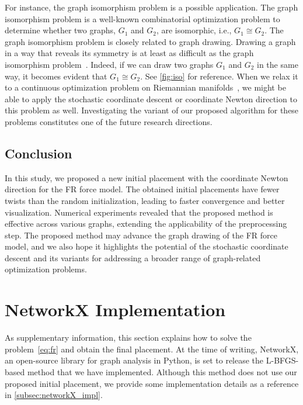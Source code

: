 \documentclass[11pt]{article}
\begin{document}
For instance, the graph isomorphism problem is a possible application. The
graph isomorphism problem is a well-known combinatorial optimization problem
to determine whether two graphs, $G_{1}$ and $G_{2}$, are isomorphic, i.e., $G_{1}
  \cong G_{2}$. The graph isomorphism problem is closely related to graph drawing. Drawing a graph in a way that reveals its symmetry is at least as difficult as the graph isomorphism problem~\citep{eades1984heuristic}. Indeed, if we can
draw two graphs $G_{1}$ and $G_{2}$ in the same way, it becomes evident that $G
    _{1}\cong G_{2}$. See \cref{fig:iso} for reference. When we relax it to a continuous
optimization problem on Riemannian manifolds~\citep{klusContinuousOptimizationMethods2023},
we might be able to apply the stochastic coordinate descent or coordinate Newton
direction to this problem as well. Investigating the variant of our proposed
algorithm for these problems constitutes one of the future research directions.

\subsection{Conclusion}
\label{sec:conclusion}

In this study, we proposed a new initial placement with the coordinate Newton
direction for the FR force model. The obtained initial placements have fewer twists than the random initialization, leading to faster convergence and better visualization.
Numerical experiments revealed that the proposed method is effective across various graphs, extending the applicability of the preprocessing step.
The proposed method may advance the graph drawing of the FR force model, and we also hope it highlights the potential of the stochastic coordinate descent and its variants for addressing a broader range of graph-related optimization problems.

\section{NetworkX Implementation}
\label{sec:algToProb1}

As supplementary information, this section explains how to solve the problem~\eqref{eq:fr} and obtain the final placement.
At the time of writing, NetworkX, an open-source library for graph analysis in Python, is set to release the L-BFGS-based method that we have implemented. Although this method does not use our proposed initial placement, we provide some implementation details as a reference in \cref{subsec:networkX_impl}.
\end{document}
